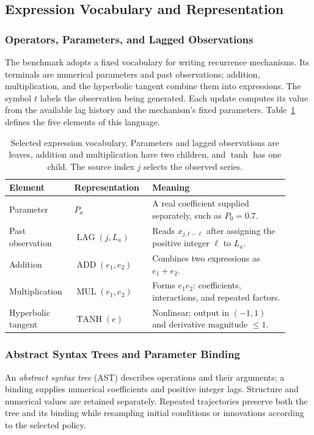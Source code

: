 \subsection{Expression Vocabulary and Representation}
\label{sec:generator-vocabulary}

\subsubsection{Operators, Parameters, and Lagged Observations}

The benchmark adopts a fixed vocabulary for writing recurrence mechanisms.
Its terminals are numerical parameters and past observations; addition,
multiplication, and the hyperbolic tangent combine them into expressions.
The symbol $t$ labels the observation being generated. Each update computes
its value from the available lag history and the mechanism's fixed parameters.
Table~\ref{tab:generator-vocabulary} defines the five elements of this language.

\begin{table}[H]
\centering\small
\begin{tabular}{@{}
>{\raggedright\arraybackslash}p{0.20\linewidth}
>{\raggedright\arraybackslash}p{0.25\linewidth}
>{\raggedright\arraybackslash}p{0.46\linewidth}@{}}
\toprule
Element & Representation & Meaning \\
\midrule
Parameter & $P_a$ &
A real coefficient supplied separately, such as $P_0=0.7$. \\
Past observation & $\operatorname{LAG}(j,L_a)$ &
Reads $x_{j,t-\ell}$ after assigning the positive integer $\ell$ to $L_a$. \\
Addition & $\operatorname{ADD}(e_1,e_2)$ &
Combines two expressions as $e_1+e_2$. \\
Multiplication & $\operatorname{MUL}(e_1,e_2)$ &
Forms $e_1e_2$: coefficients, interactions, and repeated factors. \\
Hyperbolic tangent & $\operatorname{TANH}(e)$ &
Nonlinear; output in $(-1,1)$ and derivative magnitude $\leq1$. \\
\bottomrule
\end{tabular}
\caption{Selected expression vocabulary. Parameters and lagged observations
are leaves, addition and multiplication have two children, and $\tanh$ has
one child. The source index $j$ selects the observed series.}
\label{tab:generator-vocabulary}
\end{table}

\subsubsection{Abstract Syntax Trees and Parameter Binding}
An \emph{abstract syntax tree} (AST) describes operations and their
arguments; a binding supplies numerical coefficients and positive integer
lags. Structure and numerical values are retained separately. Repeated
trajectories preserve both the tree and its binding while resampling initial
conditions or innovations according to the selected policy.

